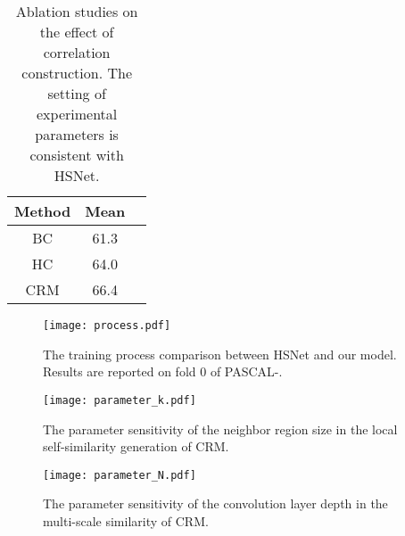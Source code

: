 \documentclass[journal]{IEEEtran}
\begin{document}
\begin{table}[t]
\setlength{\tabcolsep}{8mm}
\renewcommand\arraystretch{1.4}
\caption{Ablation studies on the effect of correlation construction. The setting of experimental parameters is consistent with HSNet.}
\label{table:ab_CorConstruction}
\setlength{\tabcolsep}{4.8mm}
\begin{center}
\begin{tabular}{ccc}
\hline
\textbf{Method} & \textbf{Mean} \\
\hline
BC   & 61.3    \\
HC   & 64.0    \\
CRM   & 66.4    \\
\hline
\end{tabular}
\end{center}
\end{table}

\begin{figure*}[ht] \begin{minipage}[t]{0.32\linewidth} \centering
		\texttt{[image:  process.pdf]} \caption{The training process comparison between HSNet and our model. Results are reported on fold 0 of PASCAL-.}
\label{fig:ab_process}
	\end{minipage}\hspace{1mm}
	\begin{minipage}[t]{0.32\linewidth}
		\centering
		\texttt{[image:  parameter\_k.pdf]}
		\caption{The parameter sensitivity of the neighbor region size  in the local self-similarity generation of CRM. }
		\label{fig:ab_parameter_k}
	\end{minipage}
	\hspace{1mm}
	\begin{minipage}[t]{0.32\linewidth}
		\centering
		\texttt{[image:  parameter\_N.pdf]}
		\caption{The parameter sensitivity of the convolution layer depth  in the multi-scale similarity of CRM.}
		\label{fig:ab_parameter_N}
	\end{minipage}
\end{figure*}
\end{document}
